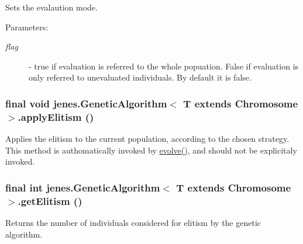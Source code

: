 Sets the evalaution mode. \begin{Desc}
\item[Parameters:]
\begin{description}
\item[{\em flag}]- true if evaluation is referred to the whole popuation. False if evaluation is only referred to unevaluated individuals. By default it is false. \end{description}
\end{Desc}
\hypertarget{classjenes_1_1_genetic_algorithm_3_01_t_01extends_01_chromosome_01_4_85647664d61cca550ed40dd70b074365}{
\subsubsection[applyElitism]{\setlength{\rightskip}{0pt plus 5cm}final void jenes.GeneticAlgorithm$<$ T extends Chromosome $>$.applyElitism ()}}
\label{classjenes_1_1_genetic_algorithm_3_01_t_01extends_01_chromosome_01_4_85647664d61cca550ed40dd70b074365}


Applies the elitism to the current population, according to the chosen strategy. This method is authomatically invoked by \hyperlink{classjenes_1_1_genetic_algorithm_3_01_t_01extends_01_chromosome_01_4_8afdd855dc891b981cbf675c63db72c3}{evolve()}, and should not be explicitaly invoked. \hypertarget{classjenes_1_1_genetic_algorithm_3_01_t_01extends_01_chromosome_01_4_8bbf6df4fc231cfc88a7e879d2bbf814}{
\subsubsection[getElitism]{\setlength{\rightskip}{0pt plus 5cm}final int jenes.GeneticAlgorithm$<$ T extends Chromosome $>$.getElitism ()}}
\label{classjenes_1_1_genetic_algorithm_3_01_t_01extends_01_chromosome_01_4_8bbf6df4fc231cfc88a7e879d2bbf814}


Returns the number of individuals considered for elitism by the genetic algorithm. 

